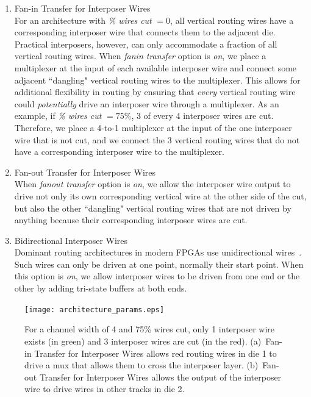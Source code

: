 \documentclass{sig-alternate-2013}
\begin{document}
\begin{enumerate}[label=(\alph*)]
\item Fan-in Transfer for Interposer Wires\\
For an architecture with \textit{\% wires cut} $=0$, all vertical routing wires have a corresponding interposer wire that connects them to the adjacent die. Practical interposers, however, can only accommodate a fraction of all vertical routing wires. When \textit{fanin transfer} option is \textit{on}, we place a multiplexer at the input of each available interposer wire and connect some adjacent ``dangling" vertical routing wires to the multiplexer. This allows for additional flexibility in routing by ensuring that \textit{every} vertical routing wire could \textit{potentially} drive an interposer wire through a multiplexer. As an example, if \textit{\% wires cut} $=75\%$, 3 of every 4 interposer wires are cut. Therefore, we place a 4-to-1 multiplexer at the input of the one interposer wire that is not cut, and we connect the 3 vertical routing wires that do not have a corresponding interposer wire to the multiplexer. 

\item Fan-out Transfer for Interposer Wires\\
When \textit{fanout transfer} option is \textit{on}, we allow the interposer wire output to drive not only its own corresponding vertical wire at the other side of the cut, but also the other ``dangling" vertical routing wires that are not driven by anything because their corresponding interposer wires are cut.

\item Bidirectional Interposer Wires\\
Dominant routing architectures in modern FPGAs use unidirectional wires~\cite{unidirectional, lewis2005stratix}. Such wires can only be driven at one point, normally their start point. When this option is \textit{on}, we allow interposer wires to be driven from one end or the other by adding tri-state buffers at both ends.
\end{enumerate}

\begin{figure}[!htbp]
\centering
\texttt{[image: architecture\_params.eps]}
\caption{For a channel width of 4 and 75\% wires cut, only 1 interposer wire exists (in green) and 3 interposer wires are cut (in the red). (a)~Fan-in Transfer for Interposer Wires allows red routing wires in die 1  to drive a mux that allows them to cross the interposer layer. (b)~Fan-out Transfer for Interposer Wires allows the output of the interposer wire to drive wires in other tracks in die 2.}
\label{fig:architecture_params}
\end{figure}
\end{document}
